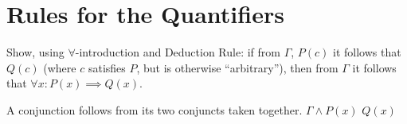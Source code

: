 \section{Rules for the Quantifiers}

\begin{Exercise}[number=18]
  Show, using $\forall$-introduction and Deduction Rule: if from $\Gamma$, $P(c)$ it follows that $Q(c)$ (where $c$ satisfies $P$, but is otherwise ``arbitrary''), then from $\Gamma$ it follows that $\forall{x} \colon P(x) \implies Q(x)$.
\end{Exercise}

\begin{Answer} [number=18]
  \begin{structured_derivation}
    \begin{nested_derivation}
      \assumption{$\Gamma$}
      \begin{nested_derivation}
        \observation
          {A conjunction follows from its two conjuncts taken together.}
          { $\Gamma \land P(x)$ }
        \observation
          {}
          { $Q(x)$ }
      \end{nested_derivation}
    \end{nested_derivation}
  \end{structured_derivation}
\end{Answer}